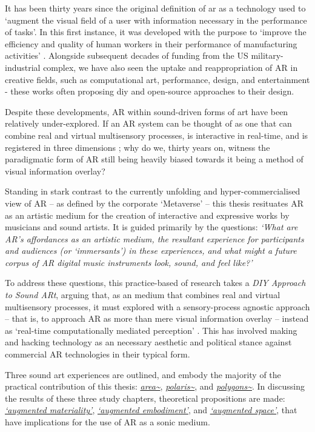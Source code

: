 \begin{SingleSpace}
    It has been thirty years since the original definition of \ac{ar} as a technology used to `augment the visual field of a user with information necessary in the performance of tasks'. In this first instance, it was developed with the purpose to `improve the efficiency and quality of human workers in their performance of manufacturing activities' \citep{caudell1992}. Alongside subsequent decades of funding from the US military-industrial complex, we have also seen the uptake and reappropriation of AR in creative fields, such as computational art, performance, design, and entertainment - these works often proposing \ac{diy} and open-source approaches to their design. 

    Despite these developments, AR within sound-driven forms of art have been relatively under-explored. If an AR system can be thought of as one that can combine real and virtual multisensory processes, is interactive in real-time, and is registered in three dimensions \citep{azuma1997}; why do we, thirty years on, witness the paradigmatic form of AR still being heavily biased \citep{billinghurst2015} towards it being a method of visual information overlay?
    
    Standing in stark contrast to the currently unfolding and hyper-commercialised view of AR -- as defined by the corporate `Metaverse' -- this thesis resituates AR as an artistic medium for the creation of interactive and expressive works by musicians and sound artists. It is guided primarily by the questions: \textit{`What are AR's affordances as an artistic medium, the resultant experience for participants and audiences (or `immersants') in these experiences, and what might a future corpus of AR digital music instruments look, sound, and feel like?'}
    
    To address these questions, this practice-based of research takes a \textit{DIY Approach to Sound ARt}, arguing that, as an medium that combines real and virtual multisensory processes, it must explored with a sensory-process agnostic approach -- that is, to approach AR as more than mere visual information overlay -- instead as `real-time computationally mediated perception' \citep{chevalier2020}. This has involved making and hacking technology as an necessary aesthetic and political stance against commercial AR technologies in their typical form.
    
    Three sound \ac{art} experiences are outlined, and embody the majority of the practical contribution of this thesis: \textit{\hyperref[sec: area]{area\textasciitilde{}}}, \textit{\hyperref[sec: polaris]{polaris\textasciitilde{}}}, and \textit{\hyperref[sec: polygons]{polygons\textasciitilde{}}}. In discussing the results of these three study chapters, theoretical propositions are made: \textit{\hyperref[sec: discussion-medium-material]{`augmented materiality'}}, \textit{\hyperref[sec: discussion-medium-embodiment]{`augmented embodiment'}}, and \textit{\hyperref[sec: discussion-medium-space]{`augmented space'}}, that have implications for the use of AR as a sonic medium.
    

\end{SingleSpace}
